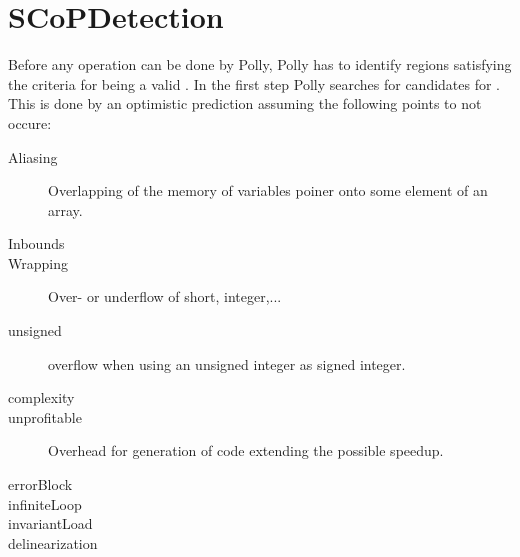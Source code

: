 \section{SCoPDetection}
Before any operation can be done by Polly, Polly has to identify regions satisfying the criteria for being a valid \scop.
In the first step Polly searches for candidates for \scops.
This is done by an optimistic prediction  assuming the following points to not occure:
\begin{description}
    \item[Aliasing] Overlapping of the memory of variables \eg poiner onto some element of an array.
    \item[Inbounds] 
    \item[Wrapping] Over- or underflow of short, integer,...
    \item[unsigned] \Eg overflow when using an unsigned integer as signed integer.
    \item[complexity] 
    \item[unprofitable] Overhead for generation of code extending the possible speedup.
    \item[errorBlock]
    \item[infiniteLoop]
    \item[invariantLoad]
    \item[delinearization]
\end{description}


